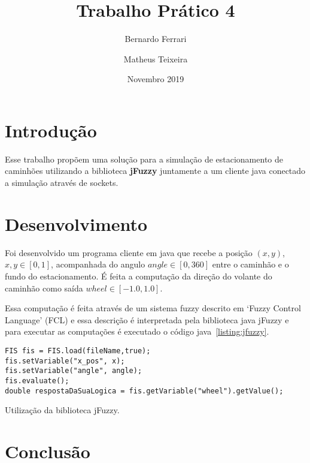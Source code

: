 \documentclass[12pt, a4paper]{article}
\title{Trabalho Prático 4}
\author{Bernardo Ferrari \and Matheus Teixeira}
\date{Novembro 2019}
\begin{document}
\maketitle

\section{Introdução}

Esse trabalho propõem uma solução para a simulação de estacionamento de
caminhões utilizando a biblioteca \textbf{jFuzzy} juntamente a um cliente
java conectado a simulação através de sockets.

\section{Desenvolvimento}

Foi desenvolvido um programa cliente em java que recebe a posição $(x, y)$, $x, y \in [0, 1]$,
acompanhada do angulo $angle \in [0, 360]$ entre o caminhão e o fundo do estacionamento.
É feita a computação da direção do volante do caminhão como saída $wheel \in [-1.0, 1.0]$.

Essa computação é feita através de um sistema fuzzy descrito em `Fuzzy Control Language' (FCL) e
essa descrição é interpretada pela biblioteca java jFuzzy e para executar as computações é executado
o código java~\ref{listing:jfuzzy}.

\begin{listing}[h!]
  \begin{verbatim}
FIS fis = FIS.load(fileName,true);
fis.setVariable("x_pos", x);
fis.setVariable("angle", angle);
fis.evaluate();
double respostaDaSuaLogica = fis.getVariable("wheel").getValue();
  \end{verbatim}
  \caption{Utilização da biblioteca jFuzzy.}\label{listing:jfuzzy}
\end{listing}

\section{Conclusão}
\end{document}
